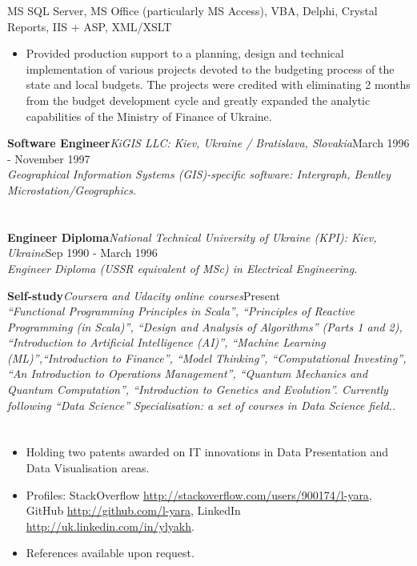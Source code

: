 \documentclass{res}
\newcommand{\jobdes}[4]{\needspace{3\baselineskip}%
{\noindent \bf #3\hspace{2ex}}{{\em \small #1}}{\hfill #2}\\{{\it \small #4.}}}
\newcommand{\osection}[1]{\section{\sc {\Large \textbf{#1}\\}} \vspace{0.30cm}}
\newif\ifFullVersion
\begin{document}
\begin{resume}
{MS SQL Server, MS Office (particularly MS Access), VBA, Delphi, Crystal Reports, IIS + ASP, XML/XSLT}
\begin{itemize}
 \item Provided production support to a planning, design and technical implementation of various projects devoted to the budgeting process of the state and local budgets.  The projects were credited with eliminating 2 months from the budget development cycle and greatly expanded the analytic capabilities of the Ministry of Finance of Ukraine.
\end{itemize}
\jobdes {KiGIS LLC: Kiev, Ukraine / Bratislava, Slovakia}{March 1996 - November 1997}{Software Engineer}
{Geographical Information Systems (GIS)-specific software: Intergraph, Bentley Microstation/Geographics}

\osection{EDUCATION}
\jobdes {National Technical University of Ukraine (KPI): Kiev, Ukraine}{Sep 1990 - March 1996}{Engineer Diploma}
 {Engineer Diploma (USSR equivalent of MSc) in Electrical Engineering}

\jobdes {Coursera and Udacity online courses}{Present}{Self-study}
{``Functional Programming Principles in Scala'', ``Principles of Reactive Programming (in Scala)'', ``Design and Analysis of Algorithms'' (Parts 1 and 2), ``Introduction to Artificial Intelligence (AI)'', ``Machine Learning (ML)'',``Introduction to Finance'', ``Model Thinking'', ``Computational Investing'', ``An Introduction to Operations Management'', ``Quantum Mechanics and Quantum Computation'', ``Introduction to Genetics and Evolution''. Currently following ``Data Science'' Specialisation: a set of courses in Data Science field.}

\osection{SPECIALS}
\vspace{0.20cm}
\begin{itemize}
\ifFullVersion
 \item An active member of Data Science London, London Java Community (LJC) and London Clojurians communities.
 \item Sports: volleyball (former player of ``CBPhoto'' Irish Division 1 team, now playing in Kent amateur league), sailing (former pupil of Kiev Olympic School).
\else
\item Holding two patents awarded on IT innovations in Data Presentation and Data Visualisation areas.
\fi
 \item Profiles: StackOverflow \url{http://stackoverflow.com/users/900174/l-yara}, GitHub \url{http://github.com/l-yara}, LinkedIn \url{http://uk.linkedin.com/in/ylyakh}.
 \item References available upon request.
\end{itemize}


\end{resume}
\end{document}

